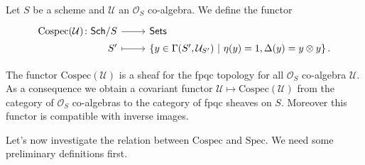 \begin{defn}[]
	Let $S$ be a scheme and $\mathcal{U}$ an $\mathcal{O}_{ S }$ co-algebra.
	We define the functor 
	\begin{equation*}
	\begin{tikzcd}[row sep = 0ex
		,/tikz/column 1/.append style={anchor=base east}
		,/tikz/column 2/.append style={anchor=base west}]
		\mathrm{Cospec}(\mathcal{U})\colon 
		\mathsf{Sch}/S\arrow[r, "", rightarrow] &
		\mathsf{Sets} \\
		S' \arrow[r, "", mapsto] & 
		\left\{ y \in \Gamma(S', \mathcal{U}_{S'}) \ \middle|\ 
		\eta(y) = 1, \Delta(y) = y \otimes y\right\}
	.\end{tikzcd}
	\end{equation*} 
\end{defn}


\begin{rem}
	The functor $\mathrm{Cospec}(\mathcal{U})$ is a sheaf for the fpqc topology
	for all $\mathcal{O}_{ S }$ co-algebra $\mathcal{U}$.
	As a consequence we obtain a covariant functor $\mathcal{U} \mapsto \mathrm{Cospec}(\mathcal{U})$
	from the category of $\mathcal{O}_{ S }$ co-algebras to the category
	of fpqc sheaves on $S$.
	Moreover this functor is compatible with inverse images.
\end{rem}


\noindent
Let's now investigate the relation between $\mathrm{Cospec}$ and $\mathrm{Spec}$.
We need some preliminary definitions first.


